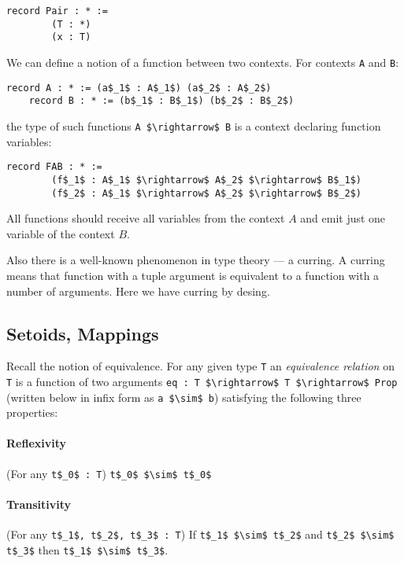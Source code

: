 \documentclass[11pt,oneside]{article}
\begin{document}
\begin{lstlisting}[mathescape=true]
    record Pair : * :=
        (T : *)
        (x : T)
\end{lstlisting}

We can define a notion of a function between two contexts.
For contexts \lstinline[mathescape=true]|A| and \lstinline[mathescape=true]|B|:

\begin{lstlisting}[mathescape=true]
    record A : * := (a$_1$ : A$_1$) (a$_2$ : A$_2$)
    record B : * := (b$_1$ : B$_1$) (b$_2$ : B$_2$)
\end{lstlisting}
the type of such functions \lstinline[mathescape=true]|A $\rightarrow$ B|
is a context declaring function variables:

\begin{lstlisting}[mathescape=true]
    record FAB : * :=
        (f$_1$ : A$_1$ $\rightarrow$ A$_2$ $\rightarrow$ B$_1$)
        (f$_2$ : A$_1$ $\rightarrow$ A$_2$ $\rightarrow$ B$_2$)
\end{lstlisting}
All functions should receive all variables from the context $A$ and
emit just one variable of the context $B$.

Also there is a well-known phenomenon in type theory --- a curring.
A curring means that function with a tuple argument is
equivalent to a function with a number of arguments.
Here we have curring by desing.

\subsection{Setoids, Mappings}

Recall the notion of equivalence. For any given type \lstinline[mathescape=true]|T|
an {\em equivalence relation} on \lstinline[mathescape=true]|T| is a function of two arguments
\lstinline[mathescape=true]|eq : T $\rightarrow$ T $\rightarrow$ Prop|
(written below in infix form as \lstinline[mathescape=true]|a $\sim$ b|)
satisfying the following three properties:

\paragraph{Reflexivity}
(For any \lstinline[mathescape=true]|t$_0$ : T|) \lstinline[mathescape=true]|t$_0$ $\sim$ t$_0$|

\paragraph{Transitivity}
(For any \lstinline[mathescape=true]|t$_1$, t$_2$, t$_3$ : T|) If
\lstinline[mathescape=true]|t$_1$ $\sim$ t$_2$| and
\lstinline[mathescape=true]|t$_2$ $\sim$ t$_3$| then
\lstinline[mathescape=true]|t$_1$ $\sim$ t$_3$|.
\end{document}
